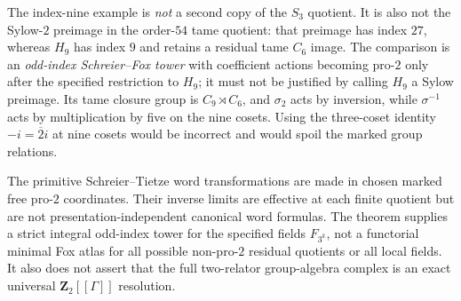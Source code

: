 \begin{warning}
\label{warn:dyadic-f135-threepower-scope}
The index-nine
example is
\emph{not} a
second copy of
the $S_3$
quotient.  It is
also not the
Sylow-$2$
preimage in the
order-$54$ tame
quotient: that
preimage has
index $27$,
whereas $H_9$
has index $9$
and retains a
residual tame
$C_6$ image.
The comparison
is an \emph{odd-index
Schreier--Fox
tower} with
coefficient
actions becoming
pro-$2$ only
after the
specified
restriction to
$H_9$; it must
not be justified
by calling
$H_9$ a
Sylow preimage.
Its tame
closure group
is
$C_9\rtimes C_6$,
and $\sigma_2$
acts by inversion,
while $\sigma^{-1}$
acts by
multiplication by
five on the
nine cosets.
Using the
three-coset
identity
$-i=\overline2i$
at nine cosets
would be incorrect
and would spoil
the marked group
relations.

The primitive
Schreier--Tietze
word transformations
are made in
chosen marked
free pro-$2$
coordinates.
Their inverse
limits are
effective at
each finite
quotient but
are not
presentation-independent
canonical
word formulas.
The theorem
supplies a
strict integral
odd-index
tower for
the specified
fields
$F_{3^k}$,
not a
functorial
minimal Fox
atlas for
all possible
non-pro-$2$
residual
quotients or
all local fields.
It also does
not assert
that the full
two-relator
group-algebra
complex is
an exact
universal
$\mathbf Z_2[[\Gamma]]$
resolution.
\end{warning}
